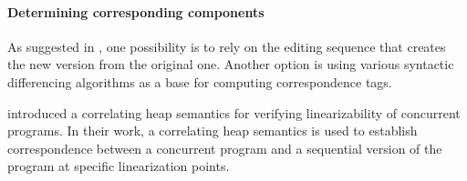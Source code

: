 

\paragraph{Determining corresponding components}

As suggested in \cite{Horwitz:PLDI90}, one possibility is to rely on the editing sequence that creates the new version from the original one. Another option is using various syntactic differencing algorithms as a base for computing correspondence tags.


\cite{ARRSY:CAV07} introduced a correlating heap semantics for verifying linearizability of concurrent programs. In their work, a correlating heap semantics is used to establish correspondence between a concurrent program and a sequential version of the program at specific linearization points.  